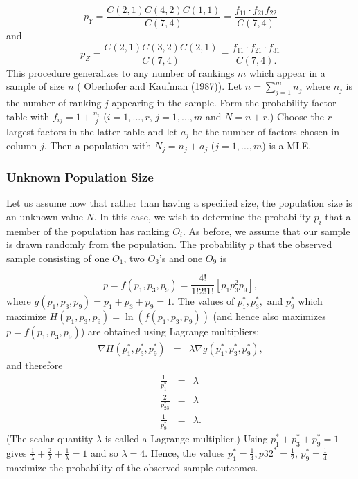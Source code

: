 \documentclass[a4paper, 12pt]{article}
\begin{document}
\begin{equation}
p_Y=\frac{C(2,1)C(4,2)C(1,1)}{C(7,4)}=\frac{f_{11} \cdot f_{21}f_{22}}{C(7,4)}
\end{equation}
{\flushleft and }
\begin{equation}
p_Z=\frac{C(2,1)C(3,2)C(2,1)}{C(7,4)}=\frac{f_{11}\cdot f_{21}\cdot f_{31}}{C(7,4).}
\end{equation}
{\flushleft This} procedure generalizes to any number of rankings $m$ which appear in a sample of size $n$ ( Oberhofer and Kaufman (1987)). Let $n=\sum_{j=1}^m n_j$ where $n_j$ is the number of ranking $j$ appearing in the sample.  Form the probability factor table with $f_{ij}=1+\frac{n_i}{j}$ ($i=1,...,r$, $j=1,...,m$ and $N=n+r$.)  Choose the $r$ largest factors in the latter table and let $a_j$ be the number of factors chosen in column $j$.  Then a population with   $N_j=n_j+a_j$ ($j=1,...,m$) is a MLE. 
\subsubsection{Unknown Population Size}


Let us assume now that rather than having a specified size, the population size is an unknown value $N$.  In this case, we wish to determine the probability $p_i$  that a member of the population has ranking $O_i$.  As before, we assume that our sample is drawn randomly from the population. The probability $p$ that the observed sample consisting of one $O_1$, two $O_3$'s and one $O_9$ is

\begin{equation}
p=f(p_1,p_3,p_9)=\frac{4!}{1!2!1!}[p_1p_3^2p_9],
\end{equation}
\label{eq:1}
{\flushleft where} $g(p_1,p_3,p_9)=p_1+p_3+p_9=1$.
The values of $p_1^*,p_3^*,$ and $p_9^*$ which maximize $H(p_1,p_3,p_9)=\ln (f(p_1,p_3,p_9))$ (and hence also maximizes $p=f(p_1,p_3,p_9)$)  are obtained using Lagrange multipliers:
\begin{eqnarray*}
	\nabla H(p_1^*,p_3^*,p_9^*) & = & \lambda \nabla g
	(p_1^*,p_3^*,p_9^*),
\end{eqnarray*}
{\flushleft and therefore}
\begin{eqnarray*}
	\frac{1}{p_1^*} & = & \lambda\\
	\frac{2}{p_23^*} & = & \lambda\\
	\frac{1}{p_9^*} & = & \lambda.
\end{eqnarray*}
{\flushleft (The scalar quantity $\lambda$ is called a Lagrange multiplier.) Using} $p_1^*+p_3^*+p_9^*=1$ gives $\frac{1}{\lambda} + \frac{2}{\lambda}+\frac{1}{\lambda}=1$ and so $ \lambda = 4$.  Hence, the values $p_1^*=\frac{1}{4}, p32^*=\frac{1}{2}$, $p_9^*=\frac{1}{4}$ maximize the probability of the observed sample outcomes.  
\end{document}
